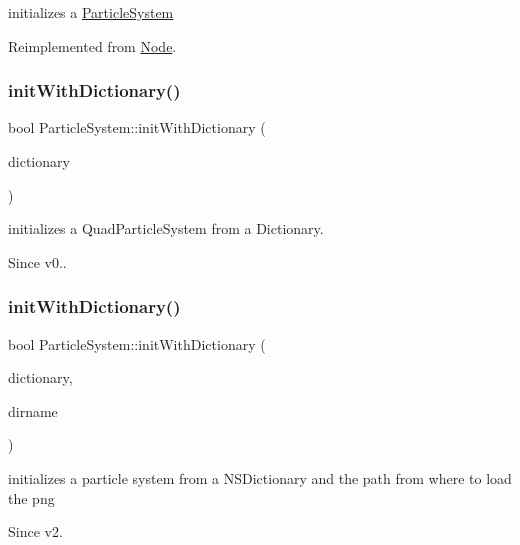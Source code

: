 initializes a \hyperlink{classParticleSystem}{Particle\+System} 

Reimplemented from \hyperlink{classNode}{Node}.

\mbox{\label{classParticleSystem_aac8d437cf5d04b3dcc803ffeb1a159f3}} 
\subsubsection{\texorpdfstring{init\+With\+Dictionary()}{initWithDictionary()}\hspace{0.1cm}{\footnotesize\ttfamily [1/4]}}
{\footnotesize\ttfamily bool Particle\+System\+::init\+With\+Dictionary (\begin{DoxyParamCaption}\item[{Value\+Map \&}]{dictionary }\end{DoxyParamCaption})}

initializes a Quad\+Particle\+System from a Dictionary. \begin{DoxySince}{Since}
v0.. 
\end{DoxySince}
\mbox{\label{classParticleSystem_af9ea32fce54ca0962029e64e9558aded}} 
\subsubsection{\texorpdfstring{init\+With\+Dictionary()}{initWithDictionary()}\hspace{0.1cm}{\footnotesize\ttfamily [2/4]}}
{\footnotesize\ttfamily bool Particle\+System\+::init\+With\+Dictionary (\begin{DoxyParamCaption}\item[{Value\+Map \&}]{dictionary,  }\item[{const std\+::string \&}]{dirname }\end{DoxyParamCaption})}

initializes a particle system from a N\+S\+Dictionary and the path from where to load the png \begin{DoxySince}{Since}
v2. 
\end{DoxySince}
\mbox{\label{classParticleSystem_aac8d437cf5d04b3dcc803ffeb1a159f3}} 
